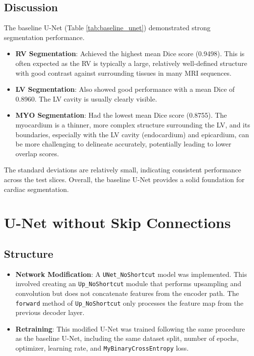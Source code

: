 \documentclass{article}
\begin{document}
\subsection{Discussion}
The baseline U-Net (Table \ref{tab:baseline_unet}) demonstrated strong segmentation performance.
\begin{itemize}
  \item \textbf{RV Segmentation}: Achieved the highest mean Dice score (0.9498). This is often expected as the RV is 
  typically a large, relatively well-defined structure with good contrast against surrounding tissues in many MRI sequences.
  \item \textbf{LV Segmentation}: Also showed good performance with a mean Dice of 0.8960. The LV cavity is usually clearly visible.
  \item \textbf{MYO Segmentation}: Had the lowest mean Dice score (0.8755). The myocardium is a thinner, more complex structure 
  surrounding the LV, and its boundaries, especially with the LV cavity (endocardium) and epicardium, can be more challenging to 
  delineate accurately, potentially leading to lower overlap scores.
\end{itemize}
The standard deviations are relatively small, indicating consistent performance across the test slices. Overall, the baseline U-Net 
provides a solid foundation for cardiac segmentation.



\section{U-Net without Skip Connections}

\subsection{Structure}
\begin{itemize}
  \item \textbf{Network Modification}: A \texttt{UNet\_NoShortcut} model was implemented. This involved creating an 
  \texttt{Up\_NoShortcut} module that performs upsampling and convolution but does not concatenate features from the encoder 
  path. The \texttt{forward} method of \texttt{Up\_NoShortcut} only processes the feature map from the previous decoder layer.
  \item \textbf{Retraining}: This modified U-Net was trained following the same procedure as the baseline U-Net, 
  including the same dataset split, number of epochs, optimizer, learning rate, and \texttt{MyBinaryCrossEntropy} loss.
\end{itemize}
\end{document}
